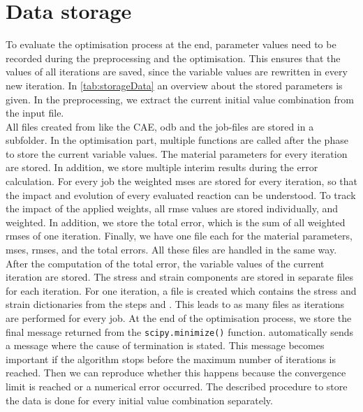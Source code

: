 \section{Data storage} \label{sec: dataStorage}

To evaluate the optimisation process at the end, parameter values need to be recorded during the preprocessing and the optimisation.
This ensures that the values of all iterations are saved, since the variable values are rewritten in every new iteration. In \autoref{tab:storageData} an overview about the stored parameters is given. 
In the preprocessing, we extract the current initial value combination from the input file. \\
\indent All files created from  like the CAE, \acrshort{odb} and the job-files are stored in a subfolder.
In the optimisation part, multiple functions are called after the phase  to store the current variable values. The material parameters for every iteration are stored. In addition, we store multiple interim results during the error calculation. For every job the weighted \acrshort{mse}s are stored for every iteration, so that the impact and evolution of every evaluated reaction can be understood. To track the impact of the applied weights, all \acrshort{rmse} values are stored individually, and weighted. In addition, we store the total error, which is the sum of all weighted \acrshort{rmse}s of one iteration. Finally, we have one file each for the material parameters, \acrshort{mse}s, \acrshort{rmse}s, and the total errors. All these files are handled in the same way. After the computation of the total error, the variable values of the current iteration are stored. The stress and strain components are stored in separate files for each iteration. For one iteration, a file is created which contains the stress and strain dictionaries from the steps  and . This leads to as many files as iterations are performed for every job. At the end of the optimisation process, we store the final message returned from the \verb|scipy.minimize()| function.  automatically sends a message where the cause of termination is stated. This message becomes important if the algorithm stops before the maximum number of iterations is reached. Then we can reproduce whether this happens because the convergence limit is reached or a numerical error occurred. The described procedure to store the data is done for every initial value combination separately.

